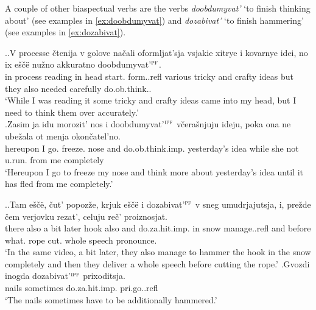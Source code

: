 A couple of other biaspectual verbs are the verbs \textit{doobdumyvat'} `to finish thinking about' (see examples in \ref{ex:doobdumyvat}) and \textit{dozabivat'} `to finish hammering' (see examples in \ref{ex:dozabivat}).

\ex.\label{ex:doobdumyvat}\ag.V processe \v{c}tenija v golove na\v{c}ali oformljat'sja vsjakie xitrye i kovarnye idei, no ix e\v{s}\v{c}\"{e} nu\v{z}no akkuratno doobdumyvat'$^{\textsc{pf}}$.\\
in process reading in head start. form..refl various tricky and crafty ideas but they also needed carefully do.ob.think..\\
\trans `While I was reading it some tricky and crafty ideas came into my head, but I need to think them over accurately.'\\
\bg.Zasim ja idu morozit' nos i doobdumyvat'$^{\textsc{ipf}}$ v\v{c}era\v{s}njuju ideju, poka ona ne ube\v{z}ala ot menja okon\v{c}atel'no.\\
hereupon I go. freeze. nose and do.ob.think.imp. yesterday's idea while she not u.run. from me completely\\
\trans `Hereupon I go to freeze my nose and think more about yesterday's idea until it has fled from me completely.'


\ex.\label{ex:dozabivat}\ag.Tam e\v{s}\v{c}\"{e}, \v{c}ut' popoz\v{z}e, krjuk e\v{s}\v{c}\"{e} i dozabivat'$^{\textsc{pf}}$ v sneg umudrjajutsja, i, pre\v{z}de \v{c}em verjovku rezat', celuju re\v{c}' proiznosjat.\\
there also {a bit} later hook also and do.za.hit.imp. in snow manage..refl and before what. rope cut. whole speech pronounce.\\
\trans `In the same video, a bit later, they also manage to hammer the hook in the snow completely and then they deliver a whole speech before cutting the rope.'
\bg.Gvozdi inogda dozabivat'$^{\textsc{ipf}}$ prixoditsja.\\
nails sometimes do.za.hit.imp. pri.go..refl\\
\trans `The nails sometimes have to be additionally hammered.'\\

